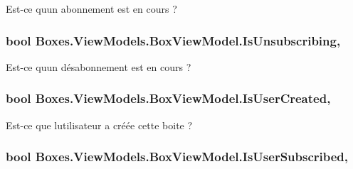 Est-\/ce qu\textquotesingle{}un abonnement est en cours ? 

\subsubsection[{\texorpdfstring{Is\+Unsubscribing}{IsUnsubscribing}}]{\setlength{\rightskip}{0pt plus 5cm}bool Boxes.\+View\+Models.\+Box\+View\+Model.\+Is\+Unsubscribing\hspace{0.3cm}{\ttfamily [get]}, {\ttfamily [set]}}\hypertarget{class_boxes_1_1_view_models_1_1_box_view_model_a657609eb5a4a5a25c7d377e5277cfd6d}{}\label{class_boxes_1_1_view_models_1_1_box_view_model_a657609eb5a4a5a25c7d377e5277cfd6d}


Est-\/ce qu\textquotesingle{}un désabonnement est en cours ? 

\subsubsection[{\texorpdfstring{Is\+User\+Created}{IsUserCreated}}]{\setlength{\rightskip}{0pt plus 5cm}bool Boxes.\+View\+Models.\+Box\+View\+Model.\+Is\+User\+Created\hspace{0.3cm}{\ttfamily [get]}, {\ttfamily [set]}}\hypertarget{class_boxes_1_1_view_models_1_1_box_view_model_aa25d0d404a895b9b5db7c74be8c3024e}{}\label{class_boxes_1_1_view_models_1_1_box_view_model_aa25d0d404a895b9b5db7c74be8c3024e}


Est-\/ce que l\textquotesingle{}utilisateur a créée cette boite ? 

\subsubsection[{\texorpdfstring{Is\+User\+Subscribed}{IsUserSubscribed}}]{\setlength{\rightskip}{0pt plus 5cm}bool Boxes.\+View\+Models.\+Box\+View\+Model.\+Is\+User\+Subscribed\hspace{0.3cm}{\ttfamily [get]}, {\ttfamily [set]}}\hypertarget{class_boxes_1_1_view_models_1_1_box_view_model_afa97dbd579230ac6f500b158f75f8254}{}\label{class_boxes_1_1_view_models_1_1_box_view_model_afa97dbd579230ac6f500b158f75f8254}


